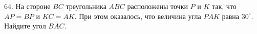 64. На стороне $BC$ треугольника $ABC$ расположены точки $P$ и $K$ так, что $AP=BP$ и $KC=AK.$ При этом оказалось, что величина угла $PAK$ равна $30^\circ.$ Найдите угол $BAC.$\\
